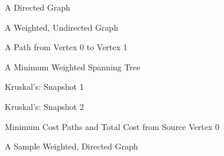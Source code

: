 \documentclass[letterpaper,10pt,english]{sphinxmanual}
\begin{document}
\begin{figure}[htbp]
\centering
\capstart

\noindent{}
\caption{A Directed Graph}\label{\detokenize{chap7/chap7:id2}}\end{figure}

\begin{figure}[htbp]
\centering
\capstart

\noindent{}
\caption{A Weighted, Undirected Graph}\label{\detokenize{chap7/chap7:id3}}\end{figure}

\begin{figure}[htbp]
\centering
\capstart

\noindent{}
\caption{A Path from Vertex 0 to Vertex 1}\label{\detokenize{chap7/chap7:id4}}\end{figure}

\begin{figure}[htbp]
\centering
\capstart

\noindent{}
\caption{A Minimum Weighted Spanning Tree}\label{\detokenize{chap7/chap7:id5}}\end{figure}

\begin{figure}[htbp]
\centering
\capstart

\noindent{}
\caption{Kruskal’s: Snapshot 1}\label{\detokenize{chap7/chap7:id6}}\end{figure}

\begin{figure}[htbp]
\centering
\capstart

\noindent{}
\caption{Kruskal’s: Snapshot 2}\label{\detokenize{chap7/chap7:id7}}\end{figure}

\begin{figure}[htbp]
\centering
\capstart

\noindent{}
\caption{Minimum Cost Paths and Total Cost from Source Vertex 0}\label{\detokenize{chap7/chap7:id8}}\end{figure}

\begin{figure}[htbp]
\centering
\capstart

\noindent{}
\caption{A Sample Weighted, Directed Graph}\label{\detokenize{chap7/chap7:id9}}\end{figure}
\end{document}

